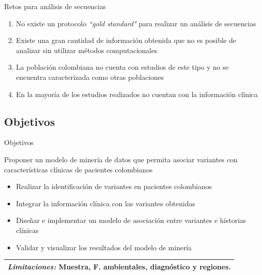 \documentclass[xcolor=dvipsnames]{beamer}
\begin{document}
\begin{frame}{Retos para análisis de secuencias}

\begin{enumerate}
	\justifying
	\item No existe un protocolo \textit{``gold standard"} para realizar un análisis de secuencias
	
	\item Existe una gran cantidad de información obtenida que no es posible de analizar sin utilizar métodos computacionales
	
	\item La población colombiana no cuenta con estudios de este tipo y no se encuentra caracterizada como otras poblaciones
	
	\item En la mayoría de los estudios realizados no cuentan con la información clínica
\end{enumerate}
\end{frame}

\subsection{Objetivos}

\begin{frame}{Objetivos}
	
	\begin{block}{}
		{\justifying 
			Proponer un modelo de minería de datos que permita asociar variantes con características clínicas de pacientes colombianos
		}
	\end{block}
	
	\begin{itemize}
		\item Realizar la identificación de variantes en pacientes colombianos
		\item Integrar la información clínica con las variantes obtenidas
		\item Diseñar e implementar un modelo de asociación entre variantes e historias clínicas
		\item Validar y visualizar los resultados del modelo de minería
	\end{itemize}
	
\begin{table}[]
\justifying
\begin{tabular}{|l|}
\hline
\tiny
\textit{Limitaciones:}  Muestra, F. ambientales, diagnóstico y regiones. \\ \hline
\end{tabular}
\end{table}
\end{frame}
\end{document}
